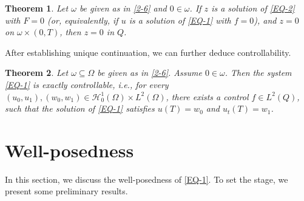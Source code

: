 \documentclass[11pt]{article}
\newtheorem{theorem}{Theorem}[section]
\numberwithin{equation}{section}
\def\s{\subseteq}
\def\om{\omega}
\def\Om{\Omega}
\def\ts{\times}
\def\mcH{\mathcal{H}}
\begin{document}
		\begin{theorem}\label{Carleman5}
			Let  $\om$  be given as in \eqref{2-6} and $0\in \om$. If $z$ is a solution of \eqref{EQ-2} with $F=0$ (or, equivalently, if $u$ is a solution of \eqref{EQ-1} with $f=0$), and $z=0$ on $\omega \times \left( 0,T\right) $, then $z=0$ in $Q$.
		\end{theorem}
		After establishing unique continuation, we can further deduce controllability.
		\begin{theorem}\label{Carleman4}
			Let $\om\s\Om$ be given as in \eqref{2-6}.
			Assume $0\in \om$. Then the system \eqref{EQ-1} is exactly controllable, i.e., for every $(u_0,u_1), (w_0,w_1) \in \mcH_0^1(\Om) \times L^2(\Omega)$,  there exists a control $f\in L^2(Q)$,  such that the solution of \eqref{EQ-1} satisfies $u(T)=w_0$ and $ u_t (T)=w_1$.				
		\end{theorem}
		
		
		
		
		\section{Well-posedness}\label{Se3}
		
		In this section, we discuss  the well-posedness of \eqref{EQ-1}. To set the stage, we present some preliminary results.
		
\end{document}
